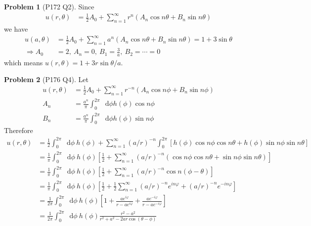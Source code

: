 \documentclass[twoside,11pt]{article}
\renewcommand*\d{\mathop{}\!\mathrm{d}}
\theoremstyle{definition}
\newtheorem{problem}{Problem}
\theoremstyle{remark}
\begin{document}
\begin{problem}[P172 Q2]
Since 
\begin{align*}
    u(r, \theta) &= \frac{1}{2}A_0 + \sum_{n=1}^\infty
    r^n(A_n\cos n\theta + B_n\sin n\theta)
\end{align*}
we have
\begin{align*}
    u(a, \theta) &= \frac{1}{2}A_0 + \sum_{n=1}^\infty
    a^n(A_n\cos n\theta + B_n\sin n\theta) = 1 + 3\sin\theta\\
    \Rightarrow A_0 &= 2,\ A_n = 0,\ B_1 = \frac{3}{a},\ B_2 = \cdots = 0
\end{align*}
which means $u(r, \theta) = 1 + 3r\sin\theta / a$.

\end{problem}



\begin{problem}[P176 Q4]
Let 
\begin{align*}
    u(r, \theta) &= \frac{1}{2}A_0 + \sum_{n=1}^\infty
    r^{-n}(A_n\cos n\phi + B_n\sin n\phi)\\
    A_n &= \frac{a^n}{\pi}\int_0^{2\pi}\d\phi h(\phi)\cos n\phi\\
    B_n &= \frac{a^n}{\pi}\int_0^{2\pi}\d\phi h(\phi)\sin n\phi
\end{align*}
Therefore
\begin{align*}
    u(r, \theta) &= \frac{1}{2}\int_0^{2\pi}\d\phi\ h(\phi) + 
    \sum_{n=1}^\infty (a/r)^{-n}\int_0^{2\pi} [h(\phi)\cos n\phi \cos n\theta
    + h(\phi)\sin n\phi\sin n\theta]\\
    &= \frac{1}{\pi}\int_0^{2\pi}\d \phi\ h(\phi)\left[ 
        \frac{1}{2} + \sum_{n=1}^\infty (a/r)^{-n}(\cos n\phi\cos n\theta
        + \sin n\phi \sin n\theta)
    \right]\\
    &= \frac{1}{\pi}\int_0^{2\pi}\d \phi\ h(\phi)\left[ 
        \frac{1}{2} + \sum_{n=1}^\infty
        (a/r)^{-n}\cos n(\phi-\theta)
    \right]\\
    &= \frac{1}{\pi}\int_0^{2\pi}\d \phi\ h(\phi)\left[ 
        \frac{1}{2} + \frac{1}{2}\sum_{n=1}^\infty
        (a/r)^{-n} e^{in\varphi} + 
        (a/r)^{-n} e^{-in\varphi}
    \right]\\
    &= \frac{1}{2\pi}\int_0^{2\pi}\d \phi\ h(\phi)\left[ 
        1 + \frac{ae^{i\varphi}}{r-ae^{i\varphi}} 
        + \frac{ae^{-i\varphi}}{r-ae^{-i\varphi}}
    \right]\\
    &= \frac{1}{2\pi}\int_0^{2\pi}\d \phi\ h(\phi) \frac{r^2-a^2}{r^2+a^2-2ar\cos(\theta-\phi)}
\end{align*}

\end{problem}
\end{document}
